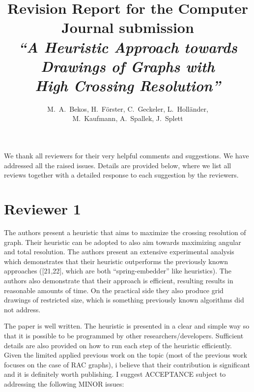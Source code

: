 \documentclass{article}
\title{{\normalsize Revision Report for the Computer Journal submission}\\
{\Large\em ``A Heuristic Approach towards Drawings of Graphs with\\High Crossing Resolution''}}
\author{}
\date{}
\author{M.~A.~Bekos, H.~F\"orster, C.~Geckeler, L.~Holl\"ander,\\M.~Kaufmann, A.~Spallek, J.~Splett}
\begin{document}
\maketitle

\noindent We thank all reviewers for their very helpful comments and suggestions. We have addressed all the raised issues. Details are provided below, where we list all reviews together with a detailed response to each suggestion by the reviewers.

\newpage


\section*{Reviewer 1}

The authors present a heuristic that aims to maximize the crossing resolution of graph. Their heuristic can be adopted to also aim towards maximizing angular and total resolution. The authors present an extensive experimental analysis which demonstrates that their heuristic outperforms the previously known approaches ([21,22], which are both ``spring-embedder'' like heuristics). The authors also demonstrate that their approach is efficient, resulting results in reasonable amounts of time. On the practical side they also produce grid drawings of restricted size, which is something previously known algorithms did not address. 

The paper is well written. The heuristic is presented in a clear and simple way so that it is possible to be programmed by other researchers/developers. Sufficient details are also provided on how to run each step of the heuristic efficiently. Given the limited applied previous work on the topic (most of the previous work focuses on the case of RAC graphs), i believe that their contribution is significant and it is definitely worth publishing. I suggest ACCEPTANCE subject to addressing the following MINOR issues:
\end{document}
